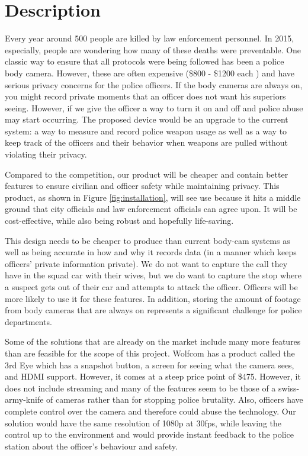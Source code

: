 \documentclass[12pt]{article}
\begin{document}
\section{Description}
Every year around 500 people are killed by law enforcement personnel. In 2015,
especially, people are wondering how many of these deaths were preventable. One
classic way to ensure that all protocols were being followed has been a police
body camera. However, these are often expensive (\$800 - \$1200 each
\cite{cam}) and have serious privacy concerns for the police officers. If the
body cameras are always on, you might record private moments that an officer
does not want his superiors seeing. However, if we give the officer a way to
turn it on and off and police abuse may start occurring. The proposed device
would be an upgrade to the current system: a way to measure and record police
weapon usage as well as a way to keep track of the officers and their behavior
when weapons are pulled without violating their privacy.

Compared to the competition, our product will be cheaper and contain better
features to ensure civilian and officer safety while maintaining privacy. This
product, as shown in Figure \ref{fig:installation},  will see use because it
hits a middle ground that city officials and law enforcement officials can
agree upon. It will be cost-effective, while also being robust and hopefully
life-saving.

This design needs to be cheaper to produce than current body-cam systems as
well as being accurate in how and why it records data (in a manner which keeps
officers' private information private). We do not want to capture the call they
have in the squad car with their wives, but we do want to capture the stop
where a suspect gets out of their car and attempts to attack the officer.
Officers will be more likely to use it for these features. In addition, storing
the amount of footage from body cameras that are always on represents a significant
challenge for police departments\cite{store1,store2}.

Some of the solutions that are already on the market include many more features
than are feasible for the scope of this project. Wolfcom has a product called
the 3rd Eye\cite{third_eye} which has a snapshot button, a screen for seeing
what the camera sees, and HDMI support. However, it comes at a steep price
point of \$475.  However, it does not include streaming and many of the
features seem to be those of a swiss-army-knife of cameras rather than for
stopping police brutality. Also, officers have complete control over the camera
and therefore could abuse the technology. Our solution would have the same
resolution of 1080p at 30fps, while leaving the control up to the environment
and would provide instant feedback to the police station about the officer's
behaviour and safety.
\end{document}
